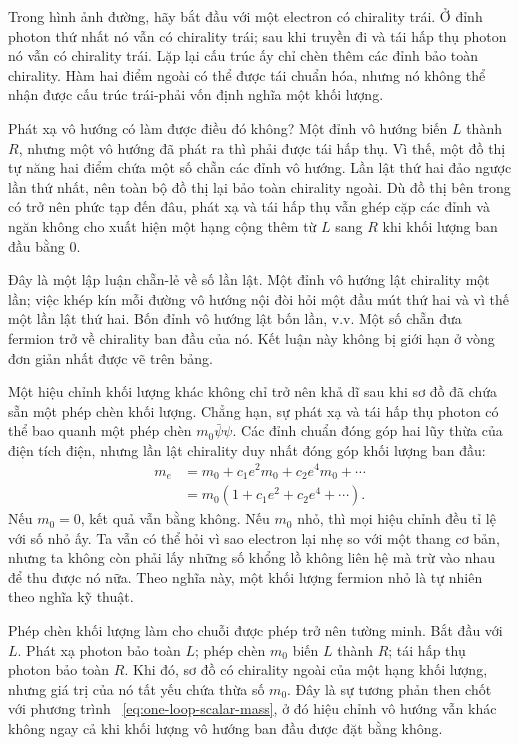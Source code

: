 Trong hình ảnh đường, hãy bắt đầu với một electron có chirality trái. Ở đỉnh photon thứ nhất nó vẫn có chirality trái; sau khi truyền đi và tái hấp thụ photon nó vẫn có chirality trái. Lặp lại cấu trúc ấy chỉ chèn thêm các đỉnh bảo toàn chirality. Hàm hai điểm ngoài có thể được tái chuẩn hóa, nhưng nó không thể nhận được cấu trúc trái-phải vốn định nghĩa một khối lượng.

Phát xạ vô hướng có làm được điều đó không? Một đỉnh vô hướng biến \(L\) thành \(R\), nhưng một vô hướng đã phát ra thì phải được tái hấp thụ. Vì thế, một đồ thị tự năng hai điểm chứa một số chẵn các đỉnh vô hướng. Lần lật thứ hai đảo ngược lần thứ nhất, nên toàn bộ đồ thị lại bảo toàn chirality ngoài. Dù đồ thị bên trong có trở nên phức tạp đến đâu, phát xạ và tái hấp thụ vẫn ghép cặp các đỉnh và ngăn không cho xuất hiện một hạng cộng thêm từ \(L\) sang \(R\) khi khối lượng ban đầu bằng 0.

Đây là một lập luận chẵn-lẻ về số lần lật. Một đỉnh vô hướng lật chirality một lần; việc khép kín mỗi đường vô hướng nội đòi hỏi một đầu mút thứ hai và vì thế một lần lật thứ hai. Bốn đỉnh vô hướng lật bốn lần, v.v. Một số chẵn đưa fermion trở về chirality ban đầu của nó. Kết luận này không bị giới hạn ở vòng đơn giản nhất được vẽ trên bảng.

Một hiệu chỉnh khối lượng khác không chỉ trở nên khả dĩ sau khi sơ đồ đã chứa sẵn một phép chèn khối lượng. Chẳng hạn, sự phát xạ và tái hấp thụ photon có thể bao quanh một phép chèn \(m_0\bar\psi\psi\). Các đỉnh chuẩn đóng góp hai lũy thừa của điện tích điện, nhưng lần lật chirality duy nhất đóng góp khối lượng ban đầu:
\begin{equation}
\begin{aligned}
m_e
&=m_0+c_1e^2m_0+c_2e^4m_0+\cdots\\
&=m_0\left(1+c_1e^2+c_2e^4+\cdots\right).
\end{aligned}
\label{eq:multiplicative-fermion-mass}
\end{equation}
Nếu \(m_0=0\), kết quả vẫn bằng không. Nếu \(m_0\) nhỏ, thì mọi hiệu chỉnh đều tỉ lệ với số nhỏ ấy. Ta vẫn có thể hỏi vì sao electron lại nhẹ so với một thang cơ bản, nhưng ta không còn phải lấy những số khổng lồ không liên hệ mà trừ vào nhau để thu được nó nữa. Theo nghĩa này, một khối lượng fermion nhỏ là tự nhiên theo nghĩa kỹ thuật.

Phép chèn khối lượng làm cho chuỗi được phép trở nên tường minh. Bắt đầu với \(L\). Phát xạ photon bảo toàn \(L\); phép chèn \(m_0\) biến \(L\) thành \(R\); tái hấp thụ photon bảo toàn \(R\). Khi đó, sơ đồ có chirality ngoài của một hạng khối lượng, nhưng giá trị của nó tất yếu chứa thừa số \(m_0\). Đây là sự tương phản then chốt với phương trình ~\eqref{eq:one-loop-scalar-mass}, ở đó hiệu chỉnh vô hướng vẫn khác không ngay cả khi khối lượng vô hướng ban đầu được đặt bằng không.

